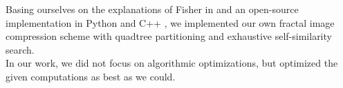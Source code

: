 Basing ourselves on the explanations of Fisher in \cite{fisher2012} and an open-source implementation in Python \cite{github-python} and C++ \cite{github-cpp}, 
we implemented our own fractal image compression scheme with quadtree partitioning and exhaustive self-similarity search. \\ 
In our work, we did not focus on algorithmic optimizations, but optimized the given computations as best as we could.
